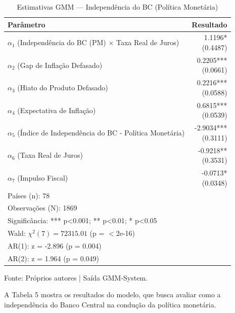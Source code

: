 \documentclass[a4paper,12pt]{article}
\begin{document}
\begin{table}[H]
    \centering
    \caption{Estimativas GMM — Independência do BC (Política Monetária)}
    \label{tab:gmm_monetary_estimates}
    \begin{tabular}{lr} 
        \toprule
        \textbf{Parâmetro} & \textbf{Resultado} \\
        \midrule
        $\alpha_1$ (Independência do BC (PM) $\times$ Taxa Real de Juros) & \makecell[r]{1.1196* \\ (0.4487)} \\
        $\alpha_2$ (Gap de Inflação Defasado) & \makecell[r]{0.2205*** \\ (0.0661)} \\
        $\alpha_3$ (Hiato do Produto Defasado) & \makecell[r]{0.2216*** \\ (0.0588)} \\
        $\alpha_4$ (Expectativa de Inflação) & \makecell[r]{0.6815*** \\ (0.0539)} \\
        $\alpha_5$ (Índice de Independência do BC - Política Monetária) & \makecell[r]{-2.9034*** \\ (0.3111)} \\
        $\alpha_6$ (Taxa Real de Juros) & \makecell[r]{-0.9218** \\ (0.3531)} \\
        $\alpha_7$ (Impulso Fiscal) & \makecell[r]{-0.0713* \\ (0.0348)} \\
        \midrule
        \multicolumn{2}{l}{Países (n): 78} \\
        \multicolumn{2}{l}{Observações (N): 1869} \\
        \multicolumn{2}{l}{Significância: *** p<0.001; ** p<0.01; * p<0.05} \\
        \multicolumn{2}{l}{Wald: $\chi^2(7) = 72315.01$ (p = $<$2e-16)} \\
        \multicolumn{2}{l}{AR(1): z = -2.896 (p = 0.004)} \\
        \multicolumn{2}{l}{AR(2): z = 1.964 (p = 0.049)} \\
        \bottomrule
    \end{tabular}

    \footnotesize{Fonte: Próprios autores | Saída GMM-System}.
\end{table}

A Tabela 5 mostra os resultados do modelo, que busca avaliar como a independência do Banco Central na condução da política monetária.
\end{document}
